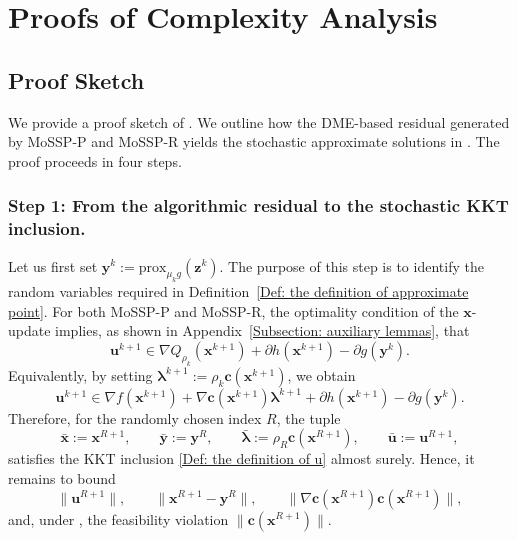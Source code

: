\documentclass{article}
\theoremstyle{plain}
\theoremstyle{definition}
\theoremstyle{remark}
\newcommand{\prox}{\mathrm{prox}}
\newcommand{\bx}{\bm{x}}
\newcommand{\bc}{\bm{c}}
\newcommand{\bu}{\bm{u}}
\newcommand{\bz}{\bm{z}}
\newcommand{\by}{\bm{y}}
\newcommand{\blambda}{\bm{\lambda}}
\numberwithin{equation}{section}
\begin{document}
\section{Proofs of Complexity Analysis}
\label{appendix:proofs of the main results}
\subsection{Proof Sketch}
\label{sub:proof-sketch}

We provide a proof sketch of . We outline how the DME-based residual generated by MoSSP-P and MoSSP-R yields the stochastic approximate solutions in . The proof proceeds in four steps.

\subsubsection*{Step 1: From the algorithmic residual to the stochastic KKT inclusion.}
Let us first set $\by^k := \prox_{\mu_k g}(\bz^k)$. The purpose of this step is to identify the random variables required in Definition~\ref{Def: the definition of approximate point}. For both MoSSP-P and MoSSP-R, the optimality condition of the \(\bx\)-update implies, as shown in Appendix~\ref{Subsection: auxiliary lemmas}, that
\[
\bu^{k+1} \in \nabla Q_{\rho_k}(\bx^{k+1}) +\partial h(\bx^{k+1}) -\partial g(\by^k).
\]
Equivalently, by setting $\blambda^{k+1}:=\rho_k\bc(\bx^{k+1})$, we obtain
\[
\bu^{k+1} \in \nabla f(\bx^{k+1}) +\nabla \bc(\bx^{k+1})\blambda^{k+1} +\partial h(\bx^{k+1}) -\partial g(\by^k).
\]
Therefore, for the randomly chosen index \(R\), the tuple
\[
    \bar{\bx}:=\bx^{R+1},\qquad \bar{\by}:=\by^R,\qquad \bar{\blambda}:=\rho_R\bc(\bx^{R+1}),\qquad \bar{\bu}:=\bu^{R+1},
\]
satisfies the KKT inclusion \eqref{Def: the definition of u} almost surely. Hence, it remains to bound
\[
    \|\bu^{R+1}\|,\qquad \|\bx^{R+1}-\by^R\|,\qquad \|\nabla\bc(\bx^{R+1})\bc(\bx^{R+1})\|,
\]
and, under , the feasibility violation \(\|\bc(\bx^{R+1})\|\).
\end{document}
